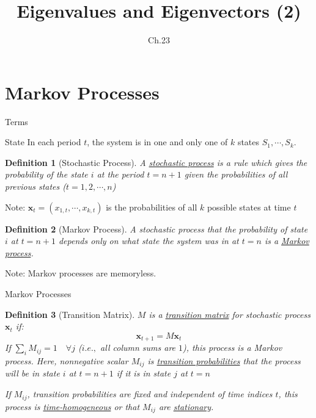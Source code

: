 \documentclass[final]{beamer}
\author[조남운]{\mail}
\title{Eigenvalues and Eigenvectors (2)}
\subtitle{Ch.23}
\newtheorem{defn}{Definition}
\newcommand{\bd}{\mathbf}
\begin{document}
	
\maketitle


\setcounter{section}{5}

\section{Markov Processes} %
\label{sec:markov_process}
\begin{frame}[t]{Terms}
	\begin{block}
		{State} In each period $t$, the system is in one and only one of $k$ states $S_1,\cdots,S_k$. 
	\end{block}
	\begin{defn}
		[Stochastic Process]
		A \uline{stochastic process} is a rule which gives the probability of the state $i$ at the period $t=n+1$ given the probabilities of all previous states ($t=1,2,\cdots,n$)
	\end{defn}
	Note: $\bd{x}_t=(x_{1,t},\cdots,x_{k,t})$ is the probabilities of all $k$ possible states at time $t$
	\begin{defn}
		[Markov Process] A stochastic process that the probability of state $i$ at $t=n+1$ depends only on what state the system was in at $t=n$ is a \uline{Markov process}. 
	\end{defn}
	Note: Markov processes are memoryless. 
\end{frame}

\begin{frame}[t]{Markov Processes}
	\begin{defn}
		[Transition Matrix] $M$ is a \uline{transition matrix} for stochastic process $\bd{x}_t$ if: \[
			\bd{x}_{t+1} = M \bd{x}_t
		\]
		If $\sum_{i} M_{ij} = 1 \quad \forall j$ ($i.e.,$ all column sums are $1$), this process is a Markov process. Here, nonnegative scalar $M_{ij}$ is \uline{transition probabilities} that the process will be in state $i$ at $t=n+1$ if it is in state $j$ at $t=n$
		
		If $M_{ij}$, transition probabilities are fixed and independent of time indices $t$, this process is \uline{time-homogeneous} or that $M_{ij}$ are \uline{stationary}.
	\end{defn}
\end{frame}
\end{document}
